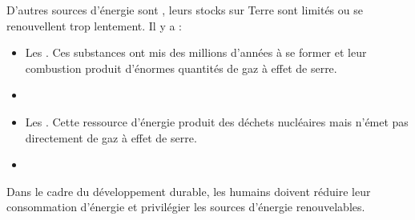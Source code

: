 \documentclass[11pt,a4paper]{article}
\begin{document}
D'autres sources d'énergie sont , leurs stocks sur Terre
sont limités ou se renouvellent trop lentement. Il y a :
\begin{itemize}
    \item Les . Ces substances ont mis des millions d'années à se former et leur combustion produit d'énormes quantités de gaz à effet de serre.
    \item[] 
    \item Les . Cette ressource d'énergie produit des déchets nucléaires mais n'émet pas directement de gaz à effet de serre.
    \item[]  
\end{itemize}

Dans le cadre du développement durable, les humains doivent réduire leur consommation d'énergie et privilégier les sources d'énergie renouvelables.
\end{document}

